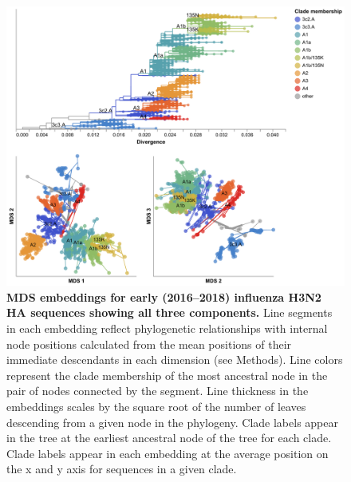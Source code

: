 \begin{figure}[!h]
\includegraphics[width=\columnwidth]{figures/flu-2016-2018-mds-by-clade.png}
\caption{{\bf MDS embeddings for early (2016--2018) influenza H3N2 HA sequences showing all three components.}
Line segments in each embedding reflect phylogenetic relationships with internal node positions calculated from the mean positions of their immediate descendants in each dimension (see Methods).
Line colors represent the clade membership of the most ancestral node in the pair of nodes connected by the segment.
Line thickness in the embeddings scales by the square root of the number of leaves descending from a given node in the phylogeny.
Clade labels appear in the tree at the earliest ancestral node of the tree for each clade.
Clade labels appear in each embedding at the average position on the x and y axis for sequences in a given clade.}\label{S_Fig_early_flu_mds_embeddings}
\end{figure}

